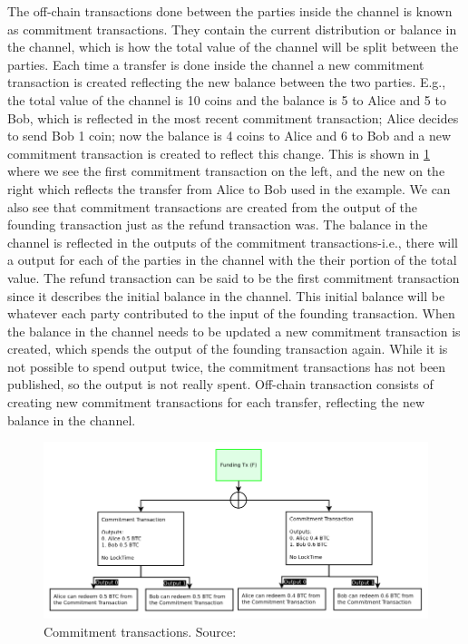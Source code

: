 The off-chain transactions done between the parties inside the channel is known as commitment transactions. 
They contain the current distribution or balance in the channel, which is how the total value of the channel will be split between the parties. Each time a transfer is done inside the channel a new commitment transaction is created reflecting the new balance between the two parties. E.g., the total value of the channel is 10 coins and the balance is 5 to Alice and 5 to Bob, which is reflected in the most recent commitment transaction; Alice decides to send Bob 1 coin; now the balance is 4 coins to Alice and 6 to Bob and a new commitment transaction is created to reflect this change. This is shown in \cref{fig:ln_commit} where we see the first commitment transaction on the left, and the new on the right which reflects the transfer from Alice to Bob used in the example. We can also see that commitment transactions are created from the output of the founding transaction just as the refund transaction was. The balance in the channel is reflected in the outputs of the commitment transactions-i.e., there will a output for each of the parties in the channel with the their portion of the total value.
The refund transaction can be said to be the first commitment transaction since it describes the initial balance in the channel. This initial balance will be whatever each party contributed to the input of the founding transaction. 
When the balance in the channel needs to be updated a new commitment transaction is created, which spends the output of the founding transaction again. While it is not possible to spend output twice, the commitment transactions has not been published, so the output is not really spent. Off-chain transaction consists of creating new commitment transactions for each transfer, reflecting the new balance in the channel.

\begin{figure}[ht]
    \centering
    \includegraphics[width=12cm]{figures/ln_commit.png}
    \caption{Commitment transactions. Source: \cite{poon2015bitcoin}}
    \label{fig:ln_commit}
\end{figure}

